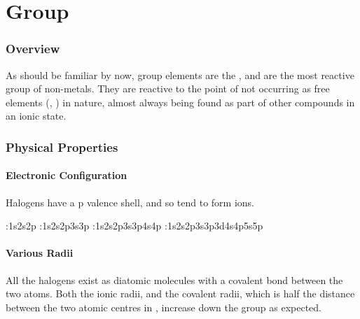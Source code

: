 

\newcommand {\rsv}{\bld{\romannum{VII}}}

\pagebreak
\part{Group }

	\section{Overview}

		As should be familiar by now, group \rsv{} elements are the , and are the most reactive
		group of non-metals. They are reactive to the point of not occurring as free elements (, )
		in nature, almost always being found as part of other compounds in an ionic state.


	\section{Physical Properties}

		\subsection{Electronic Configuration}

			Halogens have a p valence shell, and so tend to form  ions.


			\tabto{0mm}:\tabto{10mm}1s\sps{2}2s2p
			\tabto{0mm}\ch{\Cl}:\tabto{10mm}1s\sps{2}2s2p3s3p
			\tabto{0mm}:\tabto{10mm}1s\sps{2}2s2p3s3p4s4p
			\tabto{0mm}:\tabto{10mm}1s\sps{2}2s2p3s3p3d4s4p5s5p



		\subsection{Various Radii}

			All the halogens exist as diatomic molecules with a covalent bond between the two atoms. Both the ionic radii, and the covalent
			radii, which is half the distance between the two atomic centres in , increase down the group as expected.

